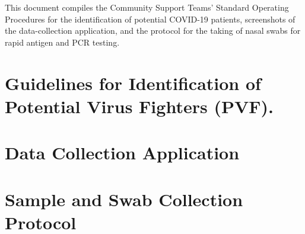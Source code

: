 \documentclass[]{elsarticle} %
\begin{document}
This document compiles the Community Support Teams' Standard Operating Procedures for the identification of potential COVID-19 patients, screenshots of the data-collection application, and the protocol for the taking of nasal swabs for rapid antigen and PCR testing.

\hypertarget{guidelines-for-identification-of-potential-virus-fighters-pvf.}{%
\section{Guidelines for Identification of Potential Virus Fighters (PVF).}\label{guidelines-for-identification-of-potential-virus-fighters-pvf.}}





\hypertarget{data-collection-application}{%
\section{Data Collection Application}\label{data-collection-application}}



\hypertarget{sample-and-swab-collection-protocol}{%
\section{Sample and Swab Collection Protocol}\label{sample-and-swab-collection-protocol}}


\end{document}
